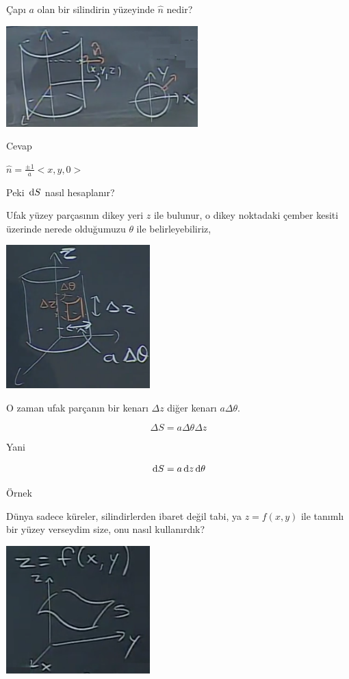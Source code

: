\documentclass[12pt,fleqn]{article}\usepackage{../../common}
\begin{document}
Çapı $a$ olan bir silindirin yüzeyinde $\hat{n}$ nedir?

\includegraphics[width=20em]{calc_multi_27_07.png}

Cevap

$\hat{n} = \frac{\pm 1}{a} < x,y,0 >$

Peki $\,\mathrm{d} S$ nasıl hesaplanır?

Ufak yüzey parçasının dikey yeri $z$ ile bulunur, o dikey noktadaki
çember kesiti üzerinde nerede olduğumuzu $\theta$ ile belirleyebiliriz,

\includegraphics[width=15em]{calc_multi_27_08.png}

O zaman ufak parçanın bir kenarı $\Delta z$ diğer kenarı $a \Delta \theta$.

$$
\Delta S = a \Delta \theta \Delta z
$$

Yani

$$
\,\mathrm{d} S = a \,\mathrm{d} z \,\mathrm{d} \theta
$$

Örnek

Dünya sadece küreler, silindirlerden ibaret değil tabi, ya $z = f(x,y)$ ile
tanımlı bir yüzey verseydim size, onu nasıl kullanırdık? 

\includegraphics[width=15em]{calc_multi_27_09.png}
\end{document}
